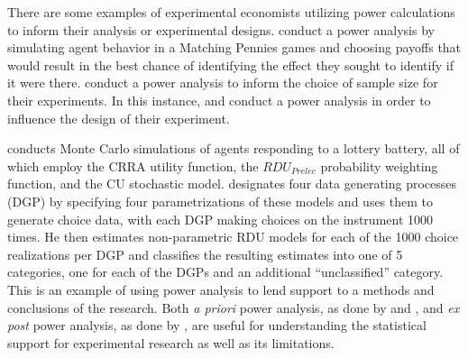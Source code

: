 \documentclass[../main.tex]{subfiles}
\begin{document}
\addtocounter{footnote}{-1}


There are some examples of experimental economists utilizing power calculations to inform their analysis or experimental designs.
\textcite{Rutstrom2009} conduct a power analysis by simulating agent behavior in a Matching Pennies games and choosing payoffs that would result in the best chance of identifying the effect they sought to identify if it were there.
\textcite[2]{Brown2016} conduct a power analysis to inform the choice of sample size for their experiments.
In this instance, \textcite{Rutstrom2009} and \textcite{Brown2016} conduct a power analysis in order to influence the design of their experiment.

\textcite[8]{Wilcox2015} conducts Monte Carlo simulations of agents responding to a lottery battery, all of which employ the CRRA utility function, the $\mathit{RDU_{Prelec}}$ probability weighting function, and the CU stochastic model.
\textcite{Wilcox2015} designates four data generating processes (DGP) by specifying four parametrizations of these models and uses them to generate choice data, with each DGP making choices on the instrument 1000 times.
He then estimates non-parametric RDU models for each of the 1000 choice realizations per DGP and classifies the resulting estimates into one of 5 categories, one for each of the DGPs and an additional \enquote{unclassified} category.
This is an example of using power analysis to lend support to a methods and conclusions of the research.
Both \textit{a priori} power analysis, as done by \textcite{Rutstrom2009} and \textcite{Brown2016}, and \textit{ex post} power analysis, as done by \textcite{Wilcox2015}, are useful for understanding the statistical support for experimental research as well as its limitations.
\end{document}
